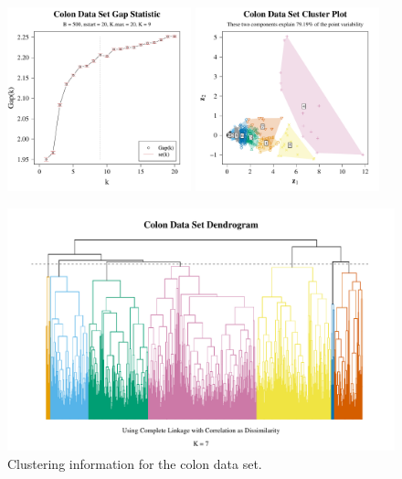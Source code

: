 \documentclass[10pt]{article}
\begin{document}
\begin{figure}[ht]
\centering
\includegraphics[width = 0.475\textwidth]{colon_gap_stat.pdf}
\includegraphics[width = 0.475\textwidth]{colon_clus_plot.pdf}

\includegraphics[width = \textwidth]{colon_den.pdf}
\caption{Clustering information for the colon data set.}
\label{colonclus}
\end{figure}

\end{document}
